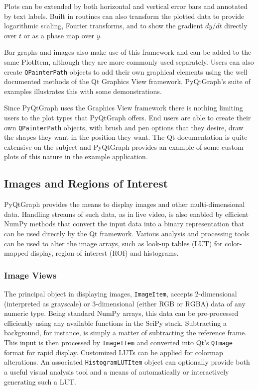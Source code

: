 \documentclass[journal]{vgtc}                %
\begin{document}
Plots can be extended by both horizontal and vertical error bars and annotated by text labels. Built in routines can also transform the plotted data to provide logarithmic scaling, Fourier transforms, and to show the gradient $dy/dt$ directly over $t$ or as a phase map over $y$.

Bar graphs and images also make use of this framework and can be added to the same PlotItem, although they are more commonly used separately. Users can also create \texttt{QPainterPath} objects to add their own graphical elements using the well documented methods of the Qt Graphics View framework. PyQtGraph's suite of examples\cite{pg_examples} illustrates this with some demonstrations.

Since PyQtGraph uses the Graphics View framework there is nothing limiting users to the plot types that PyQtGraph offers.  End users are able to create their own \texttt{QPainterPath} objects, with brush and pen options that they desire, draw the shapes they want in the position they want.  The Qt documentation is quite extensive on the subject and PyQtGraph provides an example of some custom plots of this nature in the example application.

\subsection{Images and Regions of Interest}

PyQtGraph provides the means to display images and other multi-dimensional data. Handling streams of such data, as in live video, is also enabled by efficient NumPy methods that convert the input data into a binary representation that can be used directly by the Qt framework. Various analysis and processing tools can be used to alter the image arrays, such as look-up tables (LUT) for color-mapped display, region of interest (ROI) and histograms.

\subsubsection{Image Views}

The principal object in displaying images, \texttt{ImageItem}, accepts 2-dimensional (interpreted as grayscale) or 3-dimensional (either RGB or RGBA) data of any numeric type. Being standard NumPy arrays, this data can be pre-processed efficiently using any available functions in the SciPy stack. Subtracting a background, for instance, is simply a matter of subtracting the reference frame. This input is then processed by \texttt{ImageItem} and converted into Qt's \texttt{QImage} format for rapid display. Customized LUTs can be applied for colormap alterations. An associated \texttt{HistogramLUTItem} object can optionally provide both a useful visual analysis tool and a means of automatically or interactively generating such a LUT.
\end{document}
